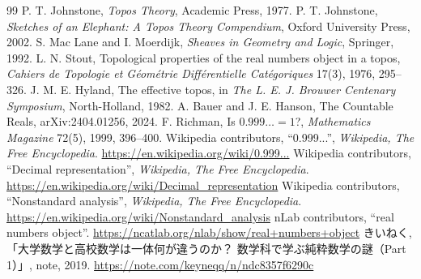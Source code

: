 \documentclass[a4paper,11pt]{ltjsarticle}
\theoremstyle{jpdef}
\theoremstyle{jpthm}
\begin{document}
\begin{thebibliography}{99}
 P. T. Johnstone, \textit{Topos Theory}, Academic Press, 1977.
 P. T. Johnstone, \textit{Sketches of an Elephant: A Topos Theory Compendium}, Oxford University Press, 2002.
 S. Mac Lane and I. Moerdijk, \textit{Sheaves in Geometry and Logic}, Springer, 1992.
 L. N. Stout, Topological properties of the real numbers object in a topos, \textit{Cahiers de Topologie et Géométrie Différentielle Catégoriques} 17(3), 1976, 295--326.
 J. M. E. Hyland, The effective topos, in \textit{The L. E. J. Brouwer Centenary Symposium}, North-Holland, 1982.
 A. Bauer and J. E. Hanson, The Countable Reals, arXiv:2404.01256, 2024.
 F. Richman, Is \(0.999\ldots=1\)?, \textit{Mathematics Magazine} 72(5), 1999, 396--400.
 Wikipedia contributors, ``0.999...'', \textit{Wikipedia, The Free Encyclopedia}. \url{https://en.wikipedia.org/wiki/0.999...}
 Wikipedia contributors, ``Decimal representation'', \textit{Wikipedia, The Free Encyclopedia}. \url{https://en.wikipedia.org/wiki/Decimal_representation}
 Wikipedia contributors, ``Nonstandard analysis'', \textit{Wikipedia, The Free Encyclopedia}. \url{https://en.wikipedia.org/wiki/Nonstandard_analysis}
 nLab contributors, ``real numbers object''. \url{https://ncatlab.org/nlab/show/real+numbers+object}
 きいねく, 「大学数学と高校数学は一体何が違うのか？ 数学科で学ぶ純粋数学の謎（Part 1）」, note, 2019. \url{https://note.com/keyneqq/n/ndc8357f6290c}
\end{thebibliography}
\end{document}
